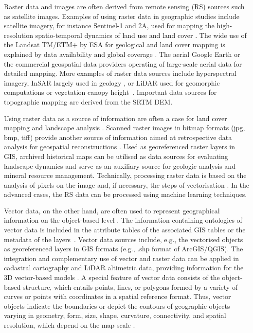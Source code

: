 \documentclass[data,article,accept,pdftex,moreauthors]{Definitions/mdpi}
\begin{document}
Raster data and images are often derived from remote sensing (RS) sources such as satellite images. Examples of using raster{ }data in {geographic} studies include satellite imagery, for instance  Sentinel-1 and 2A, used {for} mapping the high-resolution spatio-temporal dynamics of land use and land cover \cite{MERCIER2021107408,BALENZANO2021107345}. The wide {use} of the Landsat TM/ETM+ by ESA for geological and land cover mapping is {explained} by data availability and global coverage \cite{Allenby1987,LOMBARDO,SAMARA}. The aerial Google Earth or the commercial geospatial data providers operating of large-scale aerial data for detailed mapping. More examples of raster data sources include hyperspectral imagery, InSAR largely used in geology{ } \cite{TALIB2022112793,LI2022114}, or LiDAR used for geomorphic computations or vegetation canopy height~\cite{NEUGIRG2016269,NAKAO2022119953}{. }Important{ }data sources for topographic mapping are {derived from} the SRTM DEM. 

Using raster data as a source of {information} are often a case for land cover mapping and landscape analysis \cite{SZABO2019104187,RUJOIUMARE2016244,LI2021112670}. Scanned raster images in bitmap formats (jpg, bmp, tiff) provide {another} source of {information} aimed at retrospective data analysis {for} geospatial reconstructions \cite{KRAL2021107382,OSTAFIN2022107709}. Used as georeferenced raster layers in GIS, archived historical maps can be utilised as data sources for {evaluating landscape} dynamics and serve as {an} auxiliary source for geologic analysis and mineral resource management. Technically, processing raster data is based on the analysis of pixels on the image and, if necessary, the steps of vectorisation \cite{8937640,6723417,8810063}. In the advanced cases, the RS data can be processed using machine learning techniques. 

Vector data, on the other hand, are often used to represent geographical information on the object-based level \cite{LI20121331,KOCH200623}. The information containing {ontologies} of vector data is included in the attribute tables of the associated GIS tables {or the} metadata of the layers~\cite{LI20121344}. Vector data sources include, e.g., the vectorised objects as georeferenced layers in GIS formats (e.g., {.shp} format of ArcGIS/QGIS). The integration and complementary use of vector {and} raster data can be {applied in} cadastral cartography and LiDAR altimetric data, providing information for the 3D vector-based {models} \cite{VIANAFONS2020110258}. A special feature of vector data consists of {the} object-based structure, which entails points, lines, or polygons formed by a variety of curves or points with coordinates in a spatial reference format. Thus, vector objects indicate {the} boundaries or depict the contours of geographic objects {varying} in geometry, form, size, shape, curvature, connectivity, and spatial resolution, {which depend} on {the} map scale \cite{GULER2021107755}.
\end{document}
